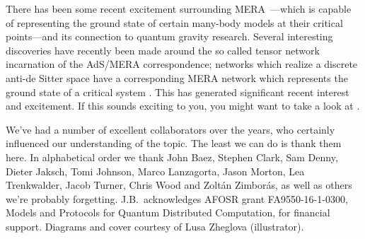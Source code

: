 \documentclass[aps,pra,12pt,nofootinbib,superscriptaddress,longbibliography]{revtex4-1}
\theoremstyle{plain}
\theoremstyle{definition}
\begin{document}
There has been some recent excitement surrounding
MERA~\cite{Vidal2010,2007PhRvL..99v0405V,2008PhRvL.101r0503G,2008PhRvL.101k0501V}---which is capable of representing the ground state of certain many-body models at their critical points---and its connection to quantum gravity research. Several interesting discoveries \cite{2012PhRvD..86f5007S} have recently been made around the so called tensor network incarnation of the AdS/MERA correspondence; networks which realize a discrete
anti-de Sitter space have a corresponding MERA network which represents the ground state of a critical system \cite{2012PhRvD..86f5007S, 2015PhRvD..91l5036B}. This has generated significant recent interest and excitement.  If this sounds exciting to you, you might want to take a look at \cite{2016arXiv160900026V,2014EPJB...87..280O, 2011JSP...145..891E}. 

 
    


  

% 
% 


\begin{acknowledgments}
We've had a number of excellent collaborators over the years, who certainly influenced our understanding of the topic.  The least we can do is thank them here.
In alphabetical order we thank John Baez, Stephen Clark, Sam Denny,
Dieter Jaksch, Tomi Johnson, Marco Lanzagorta, Jason Morton, Lea Trenkwalder, Jacob Turner, Chris Wood and Zolt\'an Zimbor\'as,
as well as others we're probably forgetting. J.B.~acknowledges AFOSR grant FA9550-16-1-0300, Models and Protocols for Quantum Distributed Computation, for financial support.   Diagrams and cover courtesy of Lusa Zheglova (illustrator).  
\end{acknowledgments}

% 

%
\end{document}
